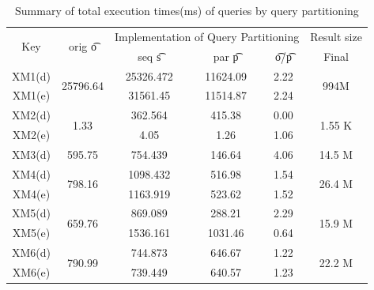 \begin{table}[t]
\centering
\caption{Summary of total execution times(ms) of queries by query partitioning}
\label{tab:qpstotaltime}
	\begin{tabular}{c|c|c|c|c|c}
		\hline
		\multirow{2}{*}{Key} & \multirow{2}{*}{orig \t{o}}  & \multicolumn{3}{c|}{Implementation of Query Partitioning} & Result size             \\ \cline{3-6}
		&                           & seq \t{s}             & par \t{p}             & \t{o}/\t{p}          & Final                   \\ \hline
		XM1(d)               & \multirow{2}{*}{25796.64} & 25326.472           & 11624.09           & 2.22           & \multirow{2}{*}{994M}   \\ \cline{1-1} \cline{3-5}
		XM1(e)               &                           & 31561.45            & 11514.87           & 2.24           &                         \\ \hline
		XM2(d)               & \multirow{2}{*}{1.33}     & 362.564             & 415.38             & 0.00           & \multirow{2}{*}{1.55 K} \\ \cline{1-1} \cline{3-5}
		XM2(e)               &                           & 4.05                & 1.26               & 1.06           &                         \\ \hline
		XM3(d)               & 595.75                    & 754.439             & 146.64             & 4.06           & 14.5 M                  \\ \hline
		XM4(d)               & \multirow{2}{*}{798.16}   & 1098.432            & 516.98             & 1.54           & \multirow{2}{*}{26.4 M} \\ \cline{1-1} \cline{3-5}
		XM4(e)               &                           & 1163.919            & 523.62             & 1.52           &                         \\ \hline
		XM5(d)               & \multirow{2}{*}{659.76}   & 869.089             & 288.21             & 2.29           & \multirow{2}{*}{15.9 M} \\ \cline{1-1} \cline{3-5}
		XM5(e)               &                           & 1536.161            & 1031.46            & 0.64           &                         \\ \hline
		XM6(d)               & \multirow{2}{*}{790.99}   & 744.873             & 646.67             & 1.22           & \multirow{2}{*}{22.2 M} \\ \cline{1-1} \cline{3-5}
		XM6(e)               &                           & 739.449             & 640.57             & 1.23           &                         \\ \hline

\end{tabular}
\end{table}
